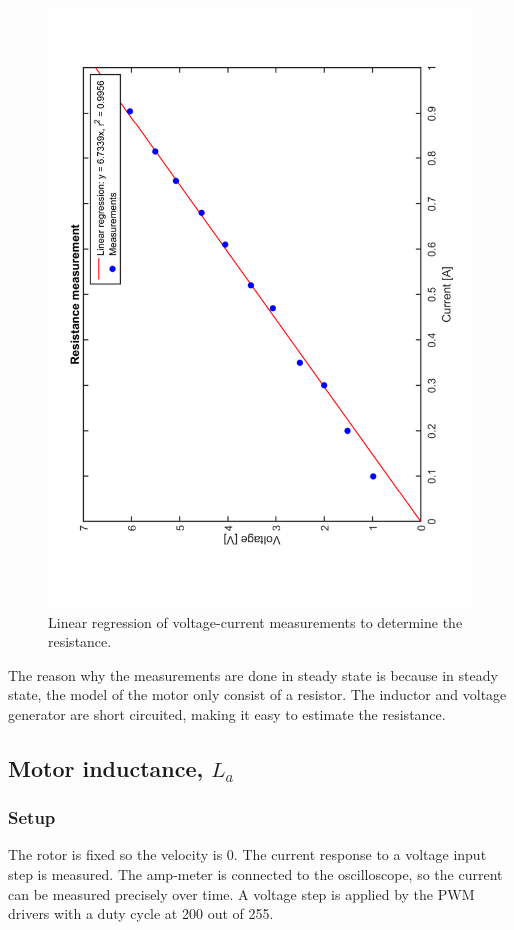 \begin{figure}[H]
	\centering
	\includegraphics[height=1\textwidth, angle = -90]{figures/motorMeasurements/resistance.pdf}
	\caption{Linear regression of voltage-current measurements to determine the resistance.}
	\label{fig:motorResistance}
\end{figure}

The reason why the measurements are done in steady state is because in steady state, the model of the motor only consist of a resistor. The inductor and voltage generator are short circuited, making it easy to estimate the resistance.

\newpage
\subsection{Motor inductance, $L_a$}
\subsubsection{Setup}
The rotor is fixed so the velocity is 0. The current response
to a voltage input step is measured.
The amp-meter is connected to the oscilloscope, so the current can be measured precisely over time. A voltage step is applied by the PWM drivers with a duty cycle at 200 out of 255.

